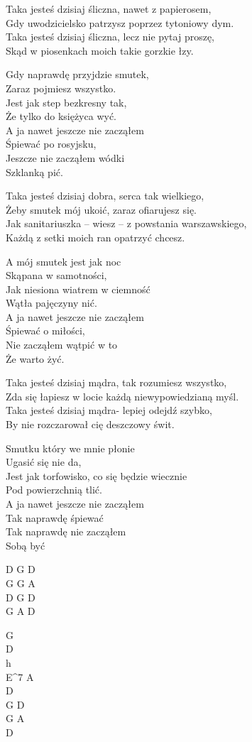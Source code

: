 \begin{text}
Taka jesteś dzisiaj śliczna, nawet z papierosem,\\
Gdy uwodzicielsko patrzysz poprzez tytoniowy dym.\\
Taka jesteś dzisiaj śliczna, lecz nie pytaj proszę,\\
Skąd w piosenkach moich takie gorzkie łzy.

\vin Gdy naprawdę przyjdzie smutek,\\
\vin Zaraz pojmiesz wszystko.\\
\vin Jest jak step bezkresny tak,\\
\vin Że tylko do księżyca wyć.\\
\vin A ja nawet jeszcze nie zacząłem\\
\vin Śpiewać po rosyjsku,\\
\vin Jeszcze nie zacząłem wódki\\
\vin Szklanką pić.

Taka jesteś dzisiaj dobra, serca tak wielkiego,\\
Żeby smutek mój ukoić, zaraz ofiarujesz się.\\
Jak sanitariuszka – wiesz – z powstania warszawskiego,\\
Każdą z setki moich ran opatrzyć chcesz.

\vin A mój smutek jest jak noc\\
\vin Skąpana w samotności,\\
\vin Jak niesiona wiatrem w ciemność\\
\vin Wątła pajęczyny nić.\\
\vin A ja nawet jeszcze nie zacząłem\\
\vin Śpiewać o miłości,\\
\vin Nie zacząłem wątpić w to\\
\vin Że warto żyć.

Taka jesteś dzisiaj mądra, tak rozumiesz wszystko,\\
Zda się łapiesz w locie każdą niewypowiedzianą myśl.\\
Taka jesteś dzisiaj mądra- lepiej odejdź szybko,\\
By nie rozczarował cię deszczowy świt.

\vin Smutku który we mnie płonie\\
\vin Ugasić się nie da,\\
\vin Jest jak torfowisko, co się będzie wiecznie\\
\vin Pod powierzchnią tlić.\\
\vin A ja nawet jeszcze nie zacząłem\\
\vin Tak naprawdę śpiewać\\
\vin Tak naprawdę nie zacząłem\\
\vin Sobą być
\end{text}
\begin{chord}
    D G D\\
    G G A\\
    D G D\\
    G A D

    G\\
    D\\
    h\\
    E^7 A\\
    D\\
    G D\\
    G A\\
    D
\end{chord}